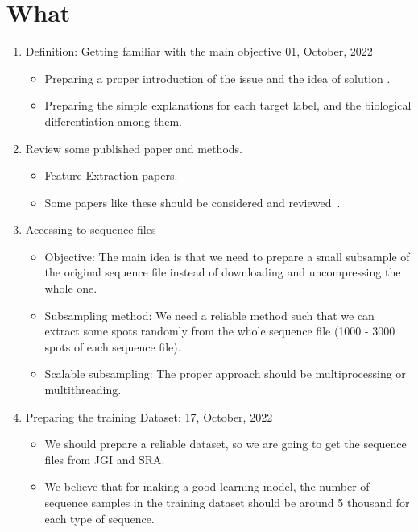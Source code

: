 \documentclass[a4paper]{article}
\newcommand{\deadline}[1]{{\color{blue} \hfill{#1} }}
\begin{document}
    \section{What}\label{sec:what}
    \begin{enumerate}
        \item Definition: Getting familiar with the main objective \deadline{01, October, 2022}
        \begin{itemize}
            \item Preparing a proper introduction of the issue and the idea of solution .
            \item Preparing the simple explanations for each target label, and the biological differentiation among them.
        \end{itemize}
        \item Review some published paper and methods.
        \begin{itemize}
            \item Feature Extraction papers.
            \item Some papers like these should be considered and reviewed~\cite[]{RF102}.
        \end{itemize}
        \item Accessing to sequence files
        \begin{itemize}
            \item Objective: The main idea is that we need to prepare a small subsample of the original sequence file instead of downloading and uncompressing the whole one.
            \item Subsampling method: We need a reliable method such that we can extract some spots randomly from the whole sequence file (1000 - 3000 spots of each sequence file).
            \item Scalable subsampling: The proper approach should be multiprocessing or multithreading.
        \end{itemize}
        \item Preparing the training Dataset:\deadline{17, October, 2022}
        \begin{itemize}
            \item We should prepare a reliable dataset, so we are going to get the sequence files from JGI and SRA.\@
            \item We believe that for making a good learning model, the number of sequence samples in the training dataset should be around 5 thousand for each type of sequence.
        \end{itemize}

\end{enumerate}
\end{document}
